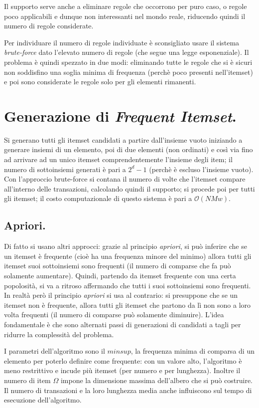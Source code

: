 \documentclass[11pt, a4page, twocolumn]{article}
\begin{document}
Il supporto serve anche a eliminare regole che occorrono per puro caso, o regole poco applicabili e dunque non interessanti nel mondo reale, riducendo quindi il numero di regole considerate. \newline

Per individuare il numero di regole individuate è sconsigliato usare il sistema \textit{brute-force} dato l'elevato numero di regole (che segue una legge esponenziale).
Il problema è quindi spezzato in due modi: eliminando tutte le regole che si è sicuri non soddisfino una soglia minima di frequenza (perchè poco presenti nell'itemset) e poi sono considerate le regole solo per gli elementi rimanenti.

\section{Generazione di \textit{Frequent Itemset}.}
Si generano tutti gli itemset candidati a partire dall'insieme vuoto iniziando a generare insiemi di un elemento, poi di due elementi (non ordinati) e così via fino ad arrivare ad un unico itemset comprendentemente l'insieme degli item; il numero di sottoinsiemi generati è pari a $2^d - 1$ (perchè è escluso l'insieme vuoto).
Con l'approccio brute-force si contana il numero di volte che l'itemset compare all'interno delle transazioni, calcolando quindi il supporto; si procede poi per tutti gli itemset; il costo computazionale di questo sistema è pari a $\mathcal{O}(NMw)$.

\subsection{Apriori.}
Di fatto si usano altri approcci: grazie al principio \textit{apriori}, si può inferire che se un itemset è frequente (cioè ha una frequenza minore del minimo) allora tutti gli itemset suoi sottoinsiemi sono frequenti (il numero di comparse che fa può solamente aumentare).
Quindi, partendo da itemset frequente con una certa popolosità, si va a ritroso affermando che tutti i suoi sottoinsiemi sono frequenti.
In realtà però il principio \textit{apriori} si usa al contrario: si presuppone che se un itemset non è frequente, allora tutti gli itemset che partono da lì non sono a loro volta frequenti (il numero di comparse può solamente diminuire).
L'idea fondamentale è che sono alternati passi di generazioni di candidati a tagli per ridurre la complessità del problema.

I parametri dell'algoritmo sono il $minsup$, la frequenza minima di comparsa di un elemento per poterlo definire come frequente: con un valore alto, l'algoritmo è meno restrittivo e incude più itemset (per numero e per lunghezza).
Inoltre il numero di item $\Omega$ impone la dimensione massima dell'albero che si può costruire.
Il numero di transazioni e la loro lunghezza media anche influiscono sul tempo di esecuzione dell'algoritmo.
\end{document}
